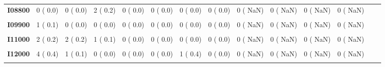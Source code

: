 \documentclass[
]{article}
\begin{document}
\begin{table}[H]
\begin{tabular}[t]{>{\raggedright\arraybackslash}p{5em}ccccccccccccc}
\textbf{I08800} & 0 (  0.0) & 0 (  0.0) & 2 (  0.2) & 0 (  0.0) & 0 (  0.0) & 0 (  0.0) & 0 (  0.0) & 0 (  NaN) & 0 (  NaN) & 0 (  NaN) & 0 (  NaN) &  & \\
\textbf{\cellcolor{gray!10}{I08900}} & \cellcolor{gray!10}{0 (  0.0)} & \cellcolor{gray!10}{0 (  0.0)} & \cellcolor{gray!10}{0 (  0.0)} & \cellcolor{gray!10}{0 (  0.0)} & \cellcolor{gray!10}{1 (  0.2)} & \cellcolor{gray!10}{0 (  0.0)} & \cellcolor{gray!10}{0 (  0.0)} & \cellcolor{gray!10}{0 (  NaN)} & \cellcolor{gray!10}{0 (  NaN)} & \cellcolor{gray!10}{0 (  NaN)} & \cellcolor{gray!10}{0 (  NaN)} & \cellcolor{gray!10}{} & \cellcolor{gray!10}{}\\
\textbf{I09900} & 1 (  0.1) & 0 (  0.0) & 0 (  0.0) & 0 (  0.0) & 0 (  0.0) & 0 (  0.0) & 0 (  0.0) & 0 (  NaN) & 0 (  NaN) & 0 (  NaN) & 0 (  NaN) &  & \\
\textbf{\cellcolor{gray!10}{I10000}} & \cellcolor{gray!10}{4 (  0.4)} & \cellcolor{gray!10}{2 (  0.2)} & \cellcolor{gray!10}{2 (  0.2)} & \cellcolor{gray!10}{2 (  0.3)} & \cellcolor{gray!10}{1 (  0.2)} & \cellcolor{gray!10}{1 (  0.4)} & \cellcolor{gray!10}{0 (  0.0)} & \cellcolor{gray!10}{0 (  NaN)} & \cellcolor{gray!10}{0 (  NaN)} & \cellcolor{gray!10}{0 (  NaN)} & \cellcolor{gray!10}{0 (  NaN)} & \cellcolor{gray!10}{} & \cellcolor{gray!10}{}\\
\textbf{I11000} & 2 (  0.2) & 2 (  0.2) & 1 (  0.1) & 0 (  0.0) & 0 (  0.0) & 0 (  0.0) & 0 (  0.0) & 0 (  NaN) & 0 (  NaN) & 0 (  NaN) & 0 (  NaN) &  & \\
\textbf{\cellcolor{gray!10}{I11900}} & \cellcolor{gray!10}{1 (  0.1)} & \cellcolor{gray!10}{1 (  0.1)} & \cellcolor{gray!10}{0 (  0.0)} & \cellcolor{gray!10}{0 (  0.0)} & \cellcolor{gray!10}{0 (  0.0)} & \cellcolor{gray!10}{0 (  0.0)} & \cellcolor{gray!10}{0 (  0.0)} & \cellcolor{gray!10}{0 (  NaN)} & \cellcolor{gray!10}{0 (  NaN)} & \cellcolor{gray!10}{0 (  NaN)} & \cellcolor{gray!10}{0 (  NaN)} & \cellcolor{gray!10}{} & \cellcolor{gray!10}{}\\
\textbf{I12000} & 4 (  0.4) & 1 (  0.1) & 0 (  0.0) & 0 (  0.0) & 0 (  0.0) & 1 (  0.4) & 0 (  0.0) & 0 (  NaN) & 0 (  NaN) & 0 (  NaN) & 0 (  NaN) &  & \\
\textbf{\cellcolor{gray!10}{I13000}} & \cellcolor{gray!10}{0 (  0.0)} & \cellcolor{gray!10}{0 (  0.0)} & \cellcolor{gray!10}{0 (  0.0)} & \cellcolor{gray!10}{2 (  0.3)} & \cellcolor{gray!10}{0 (  0.0)} & \cellcolor{gray!10}{0 (  0.0)} & \cellcolor{gray!10}{0 (  0.0)} & \cellcolor{gray!10}{0 (  NaN)} & \cellcolor{gray!10}{0 (  NaN)} & \cellcolor{gray!10}{0 (  NaN)} & \cellcolor{gray!10}{0 (  NaN)} & \cellcolor{gray!10}{} & \cellcolor{gray!10}{}\\

\end{tabular}
\end{table}
\end{document}
